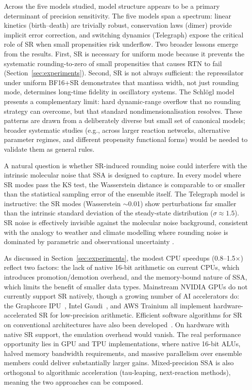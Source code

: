 \documentclass{article}
\begin{document}
Across the five models studied, model structure appears to be a primary determinant of precision sensitivity. The five models span a spectrum: linear kinetics (birth--death) are trivially robust, conservation laws (dimer) provide implicit error correction, and switching dynamics (Telegraph) expose the critical role of SR when small propensities risk underflow. Two broader lessons emerge from the results. First, SR is necessary for uniform mode because it prevents the systematic rounding-to-zero of small propensities that causes RTN to fail (Section~\ref{sec:experiments}). Second, SR is not always sufficient: the repressilator under uniform BF16+SR demonstrates that mantissa width, not just rounding mode, determines long-time fidelity in oscillatory systems. The Schl\"{o}gl model presents a complementary limit: hard dynamic-range overflow that no rounding strategy can overcome, but that standard nondimensionalisation resolves. These patterns are drawn from a deliberately diverse but small set of canonical models; broader systematic studies (e.g., across larger reaction networks, alternative parameter regimes, and different propensity functional forms) would be needed to validate them as general rules.

A natural question is whether SR-induced rounding noise could interfere with the intrinsic molecular noise that SSA is designed to capture. In every model where SR modes pass the KS test, the Wasserstein distance is comparable to or smaller than the statistical sampling error of the ensemble itself. The Telegraph model is instructive: the SR modes (Wasserstein $\sim$0.01) show perturbations far smaller than the intrinsic standard deviation of the steady-state distribution ($\sigma \approx 1.5$). SR noise is effectively invisible against the molecular noise background, consistent with the analogy to weather and climate modelling where rounding noise is dominated by parametric and observational uncertainty \cite{palmer2015,chantry2019,kimpson2024}.

As discussed in Section~\ref{sec:experiments}, the modest CPU speedups (0.8--1.5$\times$) reflect two factors: the lack of native 16-bit arithmetic on current CPUs, which introduces promotion/demotion overhead, and the memory-bound nature of SSA, which limits the benefit of smaller data types. Mainstream NVIDIA GPUs do not currently support SR natively, though a growing number of AI accelerators do: the Graphcore IPU~\cite{graphcore2020}, Intel Gaudi~\cite{intelgaudi2024}, and AWS Trainium all implement hardware-accelerated SR for low-precision arithmetic. Efficient software algorithms for SR on conventional architectures have also been developed~\cite{fasi2021}. On hardware with native SR support, the emulation overhead would vanish. The real performance opportunity lies in GPU and TPU implementations, where native 16-bit ALUs, halved memory bandwidth requirements, and massive parallelism over ensemble members could deliver substantially larger gains. Mixed-precision SSA is also orthogonal to algorithmic acceleration (tau-leaping, next-reaction methods), meaning the two approaches can be composed.
\end{document}
